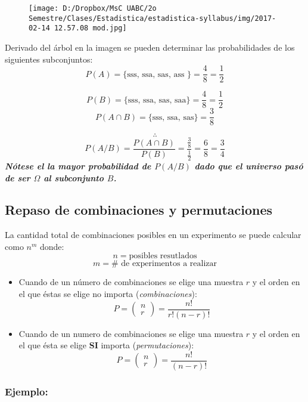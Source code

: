 \documentclass[]{book}
\begin{document}
\begin{figure}[htbp]
\centering
\texttt{[image: D:/Dropbox/MsC UABC/2o Semestre/Clases/Estadistica/estadistica-syllabus/img/2017-02-14 12.57.08 mod.jpg]}
\caption{}
\end{figure}

Derivado del árbol en la imagen se pueden determinar las probabilidades
de los siguientes subconjuntos:
\[P(A) = \{\text{sss, ssa, sas, ass }\} = \frac {4}{8} = \frac {1}{2}\]

\[P(B) = \{\text{sss, ssa, sas, saa}\} = \frac{4}{8} = \frac{1}{2}\]
\[P(A\cap B) = \{\text{sss, ssa, sas}\} = \frac{3}{8}\]

\[\therefore\]
\[P(A/B) = \frac {P(A\cap B)}{P(B)} = \frac {\frac {3}{8}}{\frac {1}{2}} = \frac {6}{8} = \frac {3}{4}\]
\textbf{\emph{Nótese el la mayor probabilidad de \(P(A/B)\) dado que el
universo pasó de ser \(\Omega\) al subconjunto \(B\).}}

\subsection{\texorpdfstring{Repaso de \textbf{combinaciones} y
\textbf{permutaciones}}{Repaso de combinaciones y permutaciones}}\label{repaso-de-combinaciones-y-permutaciones-1}

 La cantidad total de combinaciones posibles en un experimento se puede
calcular como \(n^m\) donde: \[n = \text{posibles resutlados}\]
\[m = \text{# de experimentos a realizar}\]

\begin{itemize}
\item
  Cuando de un número de combinaciones se elige una muestra \(r\) y el
  orden en el que éstas se elige no importa (\emph{combinaciones}):
  \[P = \left( \begin{array}{c} n \\ r \end{array} \right) = \frac {n!}{r!(n-r)!}\]
\item
  Cuando de un numero de combinaciones se elige una muestra \(r\) y el
  orden en el que ésta se elige \textbf{SI} importa
  (\emph{permutaciones}):
  \[P = \left( \begin{array}{c} n \\ r \end{array} \right) = \frac {n!}{(n-r)!}\]
\end{itemize}

\subsubsection{Ejemplo:}\label{ejemplo-2}
\end{document}
